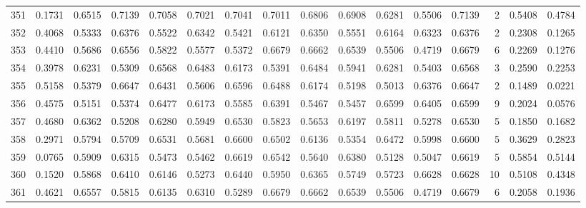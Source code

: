 \begin{tabular}{lrrrrrrrrrrrrrrr}
351 &      0.1731 &  0.6515 &  0.7139 &  0.7058 &  0.7021 &  0.7041 &  0.7011 &  0.6806 &  0.6908 &  0.6281 &   0.5506 &     0.7139 &      2 &                    0.5408 &                     0.4784 \\
352 &      0.4068 &  0.5333 &  0.6376 &  0.5522 &  0.6342 &  0.5421 &  0.6121 &  0.6350 &  0.5551 &  0.6164 &   0.6323 &     0.6376 &      2 &                    0.2308 &                     0.1265 \\
353 &      0.4410 &  0.5686 &  0.6556 &  0.5822 &  0.5577 &  0.5372 &  0.6679 &  0.6662 &  0.6539 &  0.5506 &   0.4719 &     0.6679 &      6 &                    0.2269 &                     0.1276 \\
354 &      0.3978 &  0.6231 &  0.5309 &  0.6568 &  0.6483 &  0.6173 &  0.5391 &  0.6484 &  0.5941 &  0.6281 &   0.5403 &     0.6568 &      3 &                    0.2590 &                     0.2253 \\
355 &      0.5158 &  0.5379 &  0.6647 &  0.6431 &  0.5606 &  0.6596 &  0.6488 &  0.6174 &  0.5198 &  0.5013 &   0.6376 &     0.6647 &      2 &                    0.1489 &                     0.0221 \\
356 &      0.4575 &  0.5151 &  0.5374 &  0.6477 &  0.6173 &  0.5585 &  0.6391 &  0.5467 &  0.5457 &  0.6599 &   0.6405 &     0.6599 &      9 &                    0.2024 &                     0.0576 \\
357 &      0.4680 &  0.6362 &  0.5208 &  0.6280 &  0.5949 &  0.6530 &  0.5823 &  0.5653 &  0.6197 &  0.5811 &   0.5278 &     0.6530 &      5 &                    0.1850 &                     0.1682 \\
358 &      0.2971 &  0.5794 &  0.5709 &  0.6531 &  0.5681 &  0.6600 &  0.6502 &  0.6136 &  0.5354 &  0.6472 &   0.5998 &     0.6600 &      5 &                    0.3629 &                     0.2823 \\
359 &      0.0765 &  0.5909 &  0.6315 &  0.5473 &  0.5462 &  0.6619 &  0.6542 &  0.5640 &  0.6380 &  0.5128 &   0.5047 &     0.6619 &      5 &                    0.5854 &                     0.5144 \\
360 &      0.1520 &  0.5868 &  0.6410 &  0.6146 &  0.5273 &  0.6440 &  0.5950 &  0.6365 &  0.5749 &  0.5723 &   0.6628 &     0.6628 &     10 &                    0.5108 &                     0.4348 \\
361 &      0.4621 &  0.6557 &  0.5815 &  0.6135 &  0.6310 &  0.5289 &  0.6679 &  0.6662 &  0.6539 &  0.5506 &   0.4719 &     0.6679 &      6 &                    0.2058 &                     0.1936 \\

\end{tabular}
